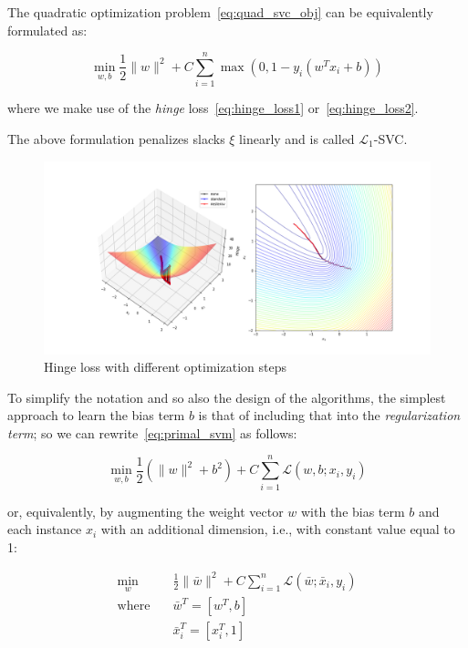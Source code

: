 The quadratic optimization problem~\eqref{eq:quad_svc_obj} can be equivalently formulated as:

\begin{equation} \label{eq:primal_l1_svc}
    \min_{w,b} \frac{1}{2} \| w \|^2 + C \sum_{i=1}^n \max(0, 1 - y_i (w^T x_i + b))
\end{equation}

where we make use of the \emph{hinge} loss~\eqref{eq:hinge_loss1} or~\eqref{eq:hinge_loss2}.

The above formulation penalizes slacks $\xi$ linearly and is called $\mathcal{L}_1$-SVC.

\begin{figure}[h!]
	\centering
  	\includegraphics[scale=0.4]{img/l1_svc_loss}
  	\caption{Hinge loss with different optimization steps}
  	\label{fig:l1_svc_loss}
\end{figure}

To simplify the notation and so also the design of the algorithms, the simplest approach to learn the bias term $b$ is that of including that into the \emph{regularization term}; so we can rewrite~\eqref{eq:primal_svm} as follows:

\begin{equation} \label{eq:reg_bias_primal_svm1}
    \min_{w,b} \frac{1}{2} (\| w \|^2 + b^2) + C \sum_{i=1}^n \mathcal{L}(w,b;x_i,y_i)
\end{equation}

or, equivalently, by augmenting the weight vector $w$ with the bias term $b$ and each instance $x_i$ with an additional dimension, i.e., with constant value equal to 1:

\begin{equation} \label{eq:reg_bias_primal_svm2}
    \begin{aligned}
        \min_{w} \quad & \frac{1}{2} \| \bar{w} \|^2 + C \sum_{i=1}^n \mathcal{L}(\bar{w};\bar{x}_i,y_i) \\
            \text{where} \quad & \bar{w}^T = [w^T, b] \\ & \bar{x}_i^T = [x_i^T, 1]
    \end{aligned}
\end{equation}


